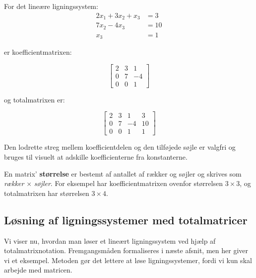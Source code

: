 \begin{example} For det lineære ligningssystem:
\[
\begin{aligned}
2 x_1+3 x_2+x_3 & =3 \\
7 x_2-4 x_3 & =10 \\
x_3 & =1
\end{aligned}
\]

er koefficientmatrixen:

\[
\left[\begin{array}{ccc}
2 & 3 & 1 \\
0 & 7 & -4 \\
0 & 0 & 1
\end{array}\right]
\]

og totalmatrixen er:

\[
\left[\begin{array}{ccc|c}
2 & 3 & 1 & 3 \\
0 & 7 & -4 & 10 \\
0 & 0 & 1 & 1
\end{array}\right]
\]

\end{example}

Den lodrette streg mellem koefficientdelen og den tilføjede søjle er valgfri og bruges til visuelt at adskille koefficienterne fra konstanterne.

\begin{definition} En matrix' \textbf{størrelse} er bestemt af antallet af rækker og søjler og skrives som \emph{rækker} $\times$ \emph{søjler}. For eksempel har koefficientmatrixen ovenfor størrelsen $3 \times 3$, og totalmatrixen har størrelsen $3 \times 4$. \end{definition}

\subsection*{Løsning af ligningssystemer med totalmatricer}

Vi viser nu, hvordan man løser et lineært ligningssystem ved hjælp af totalmatrixnotation. Fremgangsmåden formaliseres i næste afsnit, men her giver vi et eksempel. Metoden gør det lettere at løse ligningssystemer, fordi vi kun skal arbejde med matricen.

